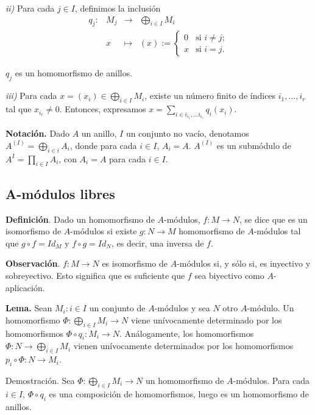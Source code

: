 \documentclass[a4paper,12pt]{article}
\begin{document}
\textit{ii)} Para cada $j\in I$, definimos la inclusión
$$\begin{array}{rrcl}
q_j:&M_j&\longrightarrow&\bigoplus_{i\in I}M_i\\
&x&\longmapsto&  (x) := \left\{ \begin{array}{ll}
         0 & \mbox{si $i\neq j$};\\
         x & \mbox{si $i=j$}.\end{array} \right.
\end{array}$$

$q_j$ es un homomorfismo de anillos.

\textit{iii)} Para cada $x=(x_i)\in \bigoplus_{i\in I}M_i$, existe un número finito de índices $i_1,...,i_r$ tal que $x_{i_r}\neq 0$. Entonces, expresamos $x=\sum_{i\in {i_{i_1},...i_{i_r}}} q_i(x_i)$.

\textbf{Notación.} Dado $A$ un anillo, $I$ un conjunto no vacío, denotamos $A^{(I)}=\bigoplus_{i\in i} A_i$, donde para cada $i\in I$, $A_i=A$. $A^{(I)}$ es un submódulo de $A^{I} = \prod_{i\in I} A_i$, con $A_i=A$ para cada $i\in I$.

\subsection{A-módulos libres}

\textbf{Definición}. Dado un homomorfismo de $A$-módulos, $f:M\rightarrow N$, se dice que es un isomorfismo de $A$-módulos si existe $g:N\rightarrow M$ homomorfismo de $A$-módulos tal que $g\circ f = Id_M$ y $f\circ g = Id_N$, es decir, una inversa de $f$.

\textbf{Observación}. $f:M\longrightarrow N$ es isomorfismo de $A$-módulos si, y sólo si, es inyectivo y sobreyectivo. Esto significa que es suficiente que $f$ sea biyectivo como $A$-aplicación.

\textbf{Lema.} Sean ${M_i:i\in I}$ un conjunto de $A$-módulos y sea $N$ otro $A$-módulo. Un homomorfismo $\Phi:\bigoplus_{i\in I} M_i \rightarrow N$ viene unívocamente determinado por los homomorfismos $\Phi \circ q_i:M_i \rightarrow N$. Análogamente, los homomorfismos $\Phi:N\rightarrow \bigoplus_{i\in I} M_i$ vienen unívocamente determinados por los homomorfismos $p_i\circ \Phi:N\rightarrow M_i$.

Demostración. Sea $\Phi:\bigoplus_{i\in I} M_i \rightarrow N$ un homomorfismo de $A$-módulos. Para cada $i\in I$, $\Phi \circ q_i$ es una composición de homomorfismos, luego es un homomorfismo de anillos.
\end{document}
